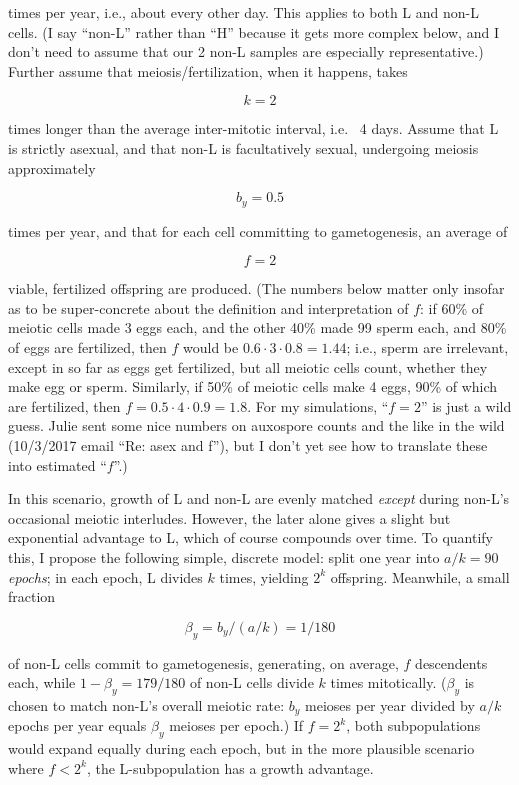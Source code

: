 \documentclass{article}\usepackage[]{graphicx}\usepackage[]{color}
\begin{document}
\noindent times per year, i.e., about every other day.  This applies to both L and non-L cells.  (I
say ``non-L'' rather than ``H'' because it gets more complex below, and I don't need to assume that
our 2 non-L samples are especially representative.)  Further assume that meiosis/fertilization, when
it happens, takes

  $$k=2$$

\noindent times longer than the average inter-mitotic interval, i.e. ~4 days.  Assume that L is
strictly asexual, and that non-L is facultatively sexual, undergoing meiosis approximately

  $$b_{y}=0.5$$

\noindent times per year, and that for each cell committing to gametogenesis, an average of 

  $$f=2$$

\noindent viable, fertilized offspring are produced.  (The numbers below matter only insofar as to
be super-concrete about the definition and interpretation of $f$: if 60\% of meiotic cells made 3
eggs each, and the other 40\% made 99 sperm each, and 80\% of eggs are fertilized, then $f$ would be
$0.6\cdot3\cdot0.8=1.44$; i.e., sperm are irrelevant, except in so far as eggs get fertilized, but
all meiotic cells count, whether they make egg or sperm.  Similarly, if 50\% of meiotic cells make 4
eggs, 90\% of which are fertilized, then $f=0.5\cdot4\cdot0.9=1.8$.  For my simulations, ``$f=2$''
is just a wild guess.  Julie sent some nice numbers on auxospore counts and the like in the wild
(10/3/2017 email ``Re: asex and f''), but I don't yet see how to translate these into estimated
``$f$''.)

In this scenario, growth of L and non-L are evenly matched \textit{except} during non-L's occasional
meiotic interludes.  However, the later alone gives a slight but exponential advantage to L, which
of course compounds over time.  To quantify this, I propose the following simple, discrete model:
split one year into $a/k=90$ \textit{epochs}; in each epoch, L divides $k$ times, yielding $2^k$
offspring.  Meanwhile, a small fraction

  $$\beta_y=b_y/(a/k)=1/180$$

\noindent of non-L cells commit to gametogenesis, generating, on average, $f$ descendents each,
while $1-\beta_y=179/180$ of non-L cells divide $k$ times mitotically.  ($\beta_y$ is chosen to
match non-L's overall meiotic rate: $b_y$ meioses per year divided by $a/k$ epochs per year equals
$\beta_y$ meioses per epoch.)  If $f=2^k$, both subpopulations would expand equally during each
epoch, but in the more plausible scenario where $f < 2^k$, the L-subpopulation has a growth
advantage.
\end{document}
